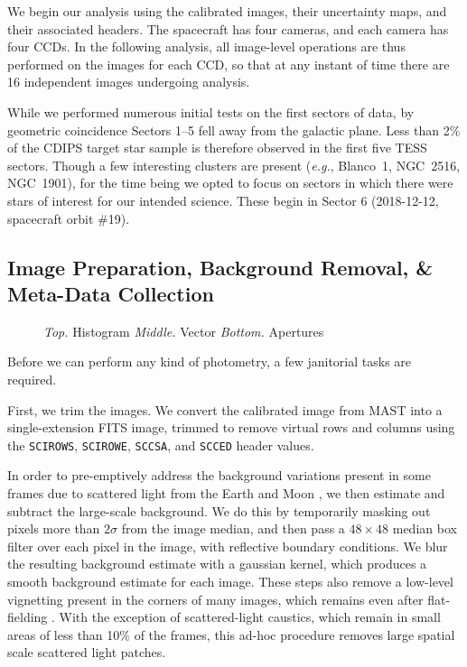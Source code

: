 \documentclass[12pt,twocolumn,tighten]{aastex62}
\begin{document}
We begin our analysis using the calibrated images, their uncertainty
maps, and their associated headers.  The spacecraft has four cameras,
and each camera has four CCDs.  In the following analysis, all
image-level operations are thus performed on the images for each CCD,
so that at any instant of time there are 16 independent images
undergoing analysis.

While we performed numerous initial tests on the first sectors of data,
by geometric coincidence Sectors 1--5 fell away from the galactic plane.
Less than 2\% of the CDIPS target star sample
is therefore observed in the first five TESS sectors.
Though a few interesting clusters are present ({\it e.g.}, Blanco~1, NGC~2516, NGC~1901),
for the time being we opted to focus on sectors in which there were stars
of interest for our intended science.
These begin in Sector 6 (2018-12-12, spacecraft orbit \#19).


\subsection{Image Preparation, Background Removal, \& Meta-Data Collection}
\label{subsec:preparation}


\begin{figure}[!ht]
	\vspace{-0.8cm}
	\vspace{-0.8cm}
	\caption{
		{\it Top.} Histogram
		{\it Middle.} Vector
		{\it Bottom.} Apertures
	}
	\label{fig:astromresid}
\end{figure}



Before we can perform any kind of photometry, a few janitorial tasks
are required.

First, we trim the images.  We convert the calibrated image from MAST
into a single-extension FITS image, trimmed to remove virtual rows and
columns using the \texttt{SCIROWS}, \texttt{SCIROWE}, \texttt{SCCSA},
and \texttt{SCCED} header values.

In order to pre-emptively address the background
variations present in some frames due to scattered light from the
Earth and Moon \citep[see][\S 7.3.1--7.3.4]{vanderspek_2018},
we then estimate and subtract the large-scale background.
We do this by
temporarily masking out pixels more than $2\sigma$ from the image median,
and then pass a $48\times48$ median box filter over each pixel in
the image, with reflective boundary conditions. 
We blur the resulting background estimate with a gaussian kernel,
which produces a
smooth background estimate for each image.  These steps also remove
a low-level vignetting
present in the corners of many images, which remains even after
flat-fielding \citep[see][\S 7.3.5]{vanderspek_2018}.
With the exception of scattered-light caustics, which remain in small
areas of less than 10\% of the frames, this ad-hoc procedure removes
large spatial scale scattered light patches.
\end{document}
